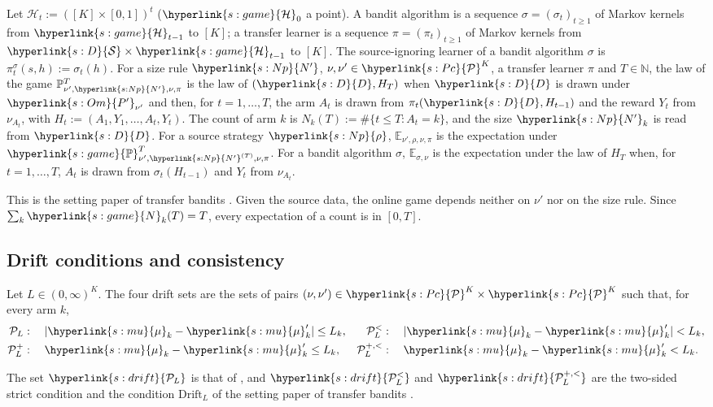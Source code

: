 \documentclass[11pt]{article}
\newcommand{\dt}[1]{\hypertarget{#1}{}}
\newcommand{\sy}[2]{\hyperlink{#1}{#2}}
\newcommand{\E}{\mathbb{E}}
\newcommand{\N}{\mathbb{N}}
\newcommand{\Pc}{\sy{s:Pc}{\mathcal{P}}}
\newcommand{\mean}{\sy{s:mu}{\mu}}
\newcommand{\Pp}{\sy{s:Om}{P'}}
\newcommand{\Np}{\sy{s:Np}{N'}}
\newcommand{\rhos}{\sy{s:Np}{\rho}}
\newcommand{\Sd}{\sy{s:D}{\mathcal{S}}}
\newcommand{\Dd}{\sy{s:D}{D}}
\newcommand{\Hs}{\sy{s:game}{\mathcal{H}}}
\newcommand{\PP}{\sy{s:game}{\mathbb{P}}}
\newcommand{\Nc}{\sy{s:game}{N}}
\newcommand{\PcL}{\sy{s:drift}{\mathcal{P}_{L}}}
\newcommand{\PcLs}{\sy{s:drift}{\mathcal{P}^{<}_{L}}}
\newcommand{\PcLos}{\sy{s:drift}{\mathcal{P}^{+,<}_{L}}}
\begin{document}
\begin{definition}\label{def:game}
\dt{s:game}Let $\mathcal H_t:=([K]\times[0,1])^{t}$ ($\Hs_0$ a point). A bandit algorithm is a
sequence $\sigma=(\sigma_t)_{t\ge1}$ of Markov kernels from $\Hs_{t-1}$ to $[K]$; a transfer
learner is a sequence $\pi=(\pi_t)_{t\ge1}$ of Markov kernels from $\Sd\times\Hs_{t-1}$ to $[K]$.
The source-ignoring learner of a bandit algorithm $\sigma$ is $\pi^\sigma_t(s,h):=\sigma_t(h)$. For a
size rule $\Np$, $\nu,\nu'\in\Pc^K$, a transfer learner $\pi$ and $T\in\N$, the law of the game
$\mathbb P^T_{\nu',\Np,\nu,\pi}$ is the law of $(\Dd,H_T)$ when $\Dd$ is drawn under $\Pp_{\nu'}$
and then, for $t=1,\dots,T$, the arm $A_t$ is drawn from $\pi_t(\Dd,H_{t-1})$ and the reward $Y_t$
from $\nu_{A_t}$, with $H_t:=(A_1,Y_1,\dots,A_t,Y_t)$. The count of arm $k$ is
$N_k(T):=\#\{t\le T:A_t=k\}$, and the size $\Np_k$ is read from $\Dd$. For a source strategy $\rhos$,
$\E_{\nu',\rho,\nu,\pi}$ is the expectation under $\PP^T_{\nu',\Np^{(T)},\nu,\pi}$. For a bandit
algorithm $\sigma$, $\E_{\sigma,\nu}$ is the expectation under the law of $H_T$ when, for
$t=1,\dots,T$, $A_t$ is drawn from $\sigma_t(H_{t-1})$ and $Y_t$ from $\nu_{A_t}$.
\end{definition}

This is the setting paper of transfer bandits \citep[Definitions~3.6--3.7]{INC-P003}. Given the source data, the online game depends neither on $\nu'$ nor on the
size rule. Since $\sum_k\Nc_k(T)=T$, every expectation of a count is in $[0,T]$.

\subsection{Drift conditions and consistency}

\begin{definition}\label{def:drift}
Let $L\in(0,\infty)^K$.\dt{s:drift} The four drift sets are the sets of pairs
$(\nu,\nu')\in\Pc^K\times\Pc^K$ such that, for every arm $k$,
\begin{align*}
\mathcal P_L&:\quad |\mean_k-\mean'_k|\le L_k, &
\mathcal P^{<}_L&:\quad |\mean_k-\mean'_k|<L_k,\\
\mathcal P^{+}_L&:\quad \mean_k-\mean'_k\le L_k, &
\mathcal P^{+,<}_L&:\quad \mean_k-\mean'_k<L_k.
\end{align*}
\end{definition}

The set $\PcL$ is that of \citet[Section~4.2]{PMRM26}, and $\PcLs$ and $\PcLos$ are the two-sided
strict condition and the condition $\mathrm{Drift}_L$ of the setting paper of transfer bandits \citep[Definition~3.8]{INC-P003}.
\end{document}

